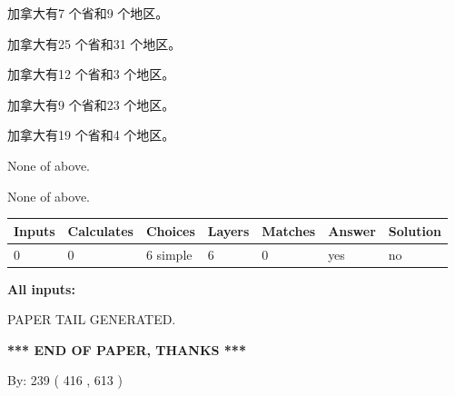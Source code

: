 \documentclass{ctexart}
\begin{document}
 
加拿大有7 个省和9 个地区。
 
 
加拿大有25 个省和31 个地区。
 
 
加拿大有12 个省和3 个地区。
 
 
加拿大有9 个省和23 个地区。
 
 
加拿大有19 个省和4 个地区。
 
 
 None of above.
 
 
\noindent{}
 
 
 None of above.
 
 
\noindent{}
 
 
   
   
   
   
\noindent\begin{tabular}{|l|l|l|l|l|l|l|}
 \hline
Inputs & Calculates & Choices & Layers & Matches & Answer & Solution \\ \hline
 0  & 
 0  & 
 6
  simple  
  & 
 6  & 
 0  & 
  yes & 
  no 
  \\ \hline
 \end{tabular}
   
   
   
   
\noindent{}
   
   
   
   
\noindent\vspace{0.1in}\hspace{-0.08in} {\textbf{\Large{All inputs: }}}
   
   
   
   
   
   
 \vspace{0.2in}
 
   
   
\vspace{2.0in} PAPER TAIL GENERATED.
   
   
   
   
\vspace{1.0in} 
{\textbf{\large{ *** END OF PAPER, THANKS *** }}} 
   
   
\hspace{1.0in} By: 
 239 ( 416 ,  613 )
   
\end{document}

